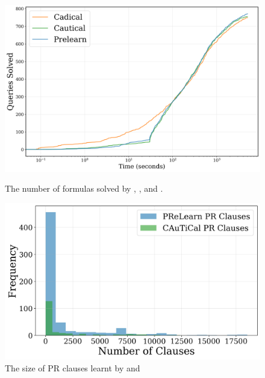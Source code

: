 \begin{figure}[!ht]
    \centering
    \begin{minipage}[b]{0.45\textwidth}
        \centering
        \includegraphics[width=\textwidth]{figs/cdf.png}
        \caption{The number of formulas solved by \tool, \prelearn, and \cadical.}
        \label{fig:cdf}
    \end{minipage}
    \hspace{0.06\textwidth}
    \begin{minipage}[b]{0.45\textwidth}
        \centering
        \includegraphics[width=\textwidth]{figs/clauses_histogram.jpg}
        \caption{The size of PR clauses learnt by \tool and \prelearn}
        \label{fig:clauses-histogram}
    \end{minipage}
\end{figure}

